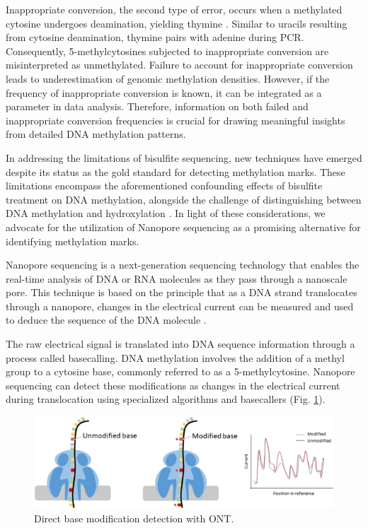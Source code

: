 Inappropriate conversion, the second type of error, occurs when a methylated cytosine undergoes deamination, yielding thymine \citep{bisulfite_inappr_conv}. Similar to uracils resulting from cytosine deamination, thymine pairs with adenine during \ac{PCR}. Consequently, 5-methylcytosines subjected to inappropriate conversion are misinterpreted as unmethylated. Failure to account for inappropriate conversion leads to underestimation of genomic methylation densities. However, if the frequency of inappropriate conversion is known, it can be integrated as a parameter in data analysis. Therefore, information on both failed and inappropriate conversion frequencies is crucial for drawing meaningful insights from detailed DNA methylation patterns.

In addressing the limitations of bisulfite sequencing, new techniques have emerged despite its status as the gold standard for detecting methylation marks. These limitations encompass the aforementioned confounding effects of bisulfite treatment on DNA methylation, alongside the challenge of distinguishing between DNA methylation and hydroxylation \citep{ont_vs_bisulfite}. In light of these considerations, we advocate for the utilization of Nanopore sequencing as a promising alternative for identifying methylation marks.

Nanopore sequencing is a next-generation sequencing technology that enables the real-time analysis of DNA or RNA molecules as they pass through a nanoscale pore. This technique is based on the principle that as a DNA strand translocates through a nanopore, changes in the electrical current can be measured and used to deduce the sequence of the DNA molecule \cite{ont}. 

The raw electrical signal is translated into DNA sequence information through a process called basecalling. DNA methylation involves the addition of a methyl group to a cytosine base, commonly referred to as a 5-methylcytosine. Nanopore sequencing can detect these modifications as changes in the electrical current during translocation using specialized algorithms and basecallers (Fig. \ref{ont_epi}).

\begin{figure}[ht]
	\begin{center}
		\includegraphics[width = \textwidth]{Fig/ont_epi.png}
	\end{center}
	\caption{Direct base modification detection with \ac{ONT}.}\label{ont_epi}
\end{figure}

